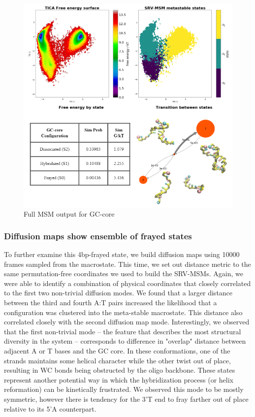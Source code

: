 \documentclass[journal=jpcbfk,manuscript=article]{achemso}
\begin{document}
\begin{figure}[ht!]
	\begin{center}
        \includegraphics[width=\textwidth]{Figs/figs_0804/GC-core_thermo.PNG}
        \caption{Full MSM output for GC-core}
        \label{fig:GC-core_thermo}
	\end{center}
\end{figure}

\subsubsection{\label{sec:Results}Diffusion maps show ensemble of frayed states}

To further examine this 4bp-frayed state, we build diffusion maps using 10000 frames sampled from the macrostate. This time, we set out distance metric to the same permutation-free coordinates we used to build the SRV-MSMs. Again, we were able to identify a combination of physical coordinates that closely correlated to the first two non-trivial diffusion modes. We found that a larger distance between the third and fourth A:T pairs increased the likelihood that a configuration was clustered into the meta-stable macrostate. This distance also correlated closely with the second diffusion map mode. Interestingly, we observed that the first non-trivial mode -- the feature that describes the most structural diversity in the system -- corresponds to difference in "overlap" distance between adjacent A or T bases and the GC core. In these conformations, one of the strands maintains some helical character while the other twist out of place, resulting in WC bonds being obstructed by the oligo backbone. These states represent another potential way in which the hybridization process (or helix reformation) can be kinetically frustrated. We observed this mode to be mostly symmetric, however there is tendency for the 3'T end to fray farther out of place relative to its 5'A counterpart.
\end{document}

